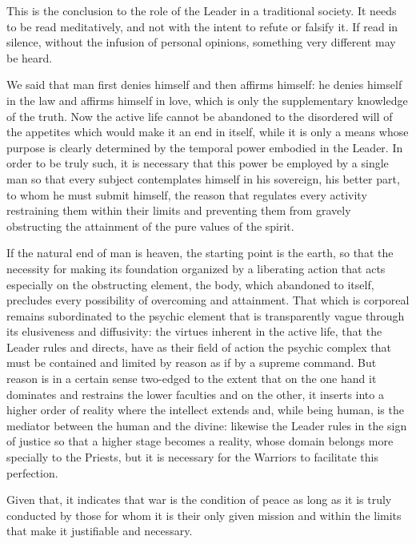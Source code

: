 \begin{quotex}
This is the conclusion to the role of the Leader in a traditional society. It needs to be read meditatively, and not with the intent to refute or falsify it. If read in silence, without the infusion of personal opinions, something very different may be heard. 

\end{quotex}
We said that man first denies himself and then affirms himself: he denies himself in the law and affirms himself in love, which is only the supplementary knowledge of the truth. Now the active life cannot be abandoned to the disordered will of the appetites which would make it an end in itself, while it is only a means whose purpose is clearly determined by the temporal power embodied in the Leader. In order to be truly such, it is necessary that this power be employed by a single man so that every subject contemplates himself in his sovereign, his better part, to whom he must submit himself, the reason that regulates every activity restraining them within their limits and preventing them from gravely obstructing the attainment of the pure values of the spirit.

If the natural end of man is heaven, the starting point is the earth, so that the necessity for making its foundation organized by a liberating action that acts especially on the obstructing element, the body, which abandoned to itself, precludes every possibility of overcoming and attainment. That which is corporeal remains subordinated to the psychic element that is transparently vague through its elusiveness and diffusivity: the virtues inherent in the active life, that the Leader rules and directs, have as their field of action the psychic complex that must be contained and limited by reason as if by a supreme command. But reason is in a certain sense two-edged to the extent that on the one hand it dominates and restrains the lower faculties and on the other, it inserts into a higher order of reality where the intellect extends and, while being human, is the mediator between the human and the divine: likewise the Leader rules in the sign of justice so that a higher stage becomes a reality, whose domain belongs more specially to the Priests, but it is necessary for the Warriors to facilitate this perfection.

Given that, it indicates that war is the condition of peace as long as it is truly conducted by those for whom it is their only given mission and within the limits that make it justifiable and necessary.

